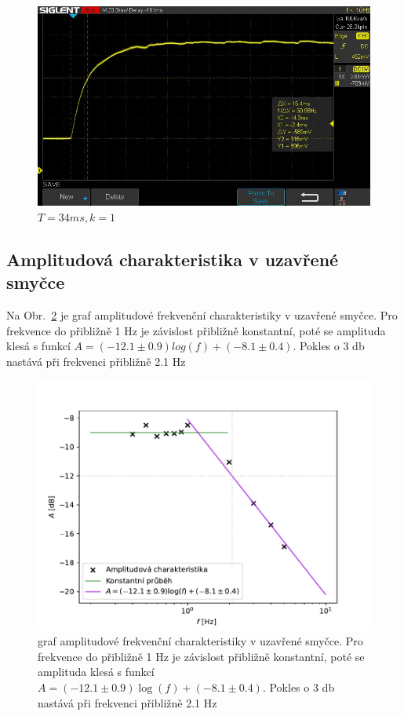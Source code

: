 		\begin{figure}[!hbt] 
			\centering
			\includegraphics[scale=0.6]{img/SDS00002.jpg} 
			\caption{$T=34\unit{ms}, k=1$} 
			\label{fig:prechodova_uzavrena_k1}
		\end{figure}

	\subsection{Amplitudová charakteristika v uzavřené smyčce}
		Na Obr.~\ref{fig:amplitudova_uzavrena} je graf amplitudové frekvenční charakteristiky v uzavřené smyčce. Pro frekvence do přibližně 1 Hz je závislost přibližně konstantní, poté se amplituda klesá s funkcí $A=(-12.1\pm 0.9)log(f)+(-8.1\pm 0.4)$. Pokles o 3 db nastává při frekvenci přibližně 2.1 Hz
		\begin{figure}[!hbt] 
			\centering
			\includegraphics[]{img/graf_amplitudova_uzavrena.pdf} 
			\caption{graf amplitudové frekvenční charakteristiky v uzavřené smyčce. Pro frekvence do přibližně 1 Hz je závislost přibližně konstantní, poté se amplituda klesá s funkcí $A=(-12.1\pm 0.9)\log(f)+(-8.1\pm 0.4)$. Pokles o 3 db nastává při frekvenci přibližně 2.1 Hz} 
			\label{fig:amplitudova_uzavrena}
		\end{figure}

